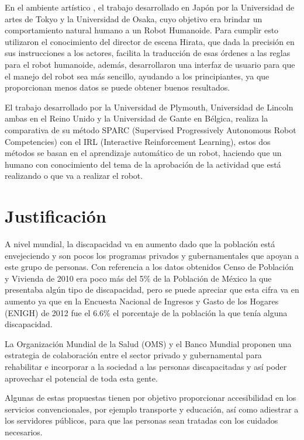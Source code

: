 En el ambiente artístico \cite{Nishiguchi2017}, el trabajo desarrollado en
 Japón por la Universidad de artes de Tokyo y la Universidad de Osaka, cuyo
 objetivo era brindar un comportamiento natural humano a un Robot Humanoide.
 Para cumplir esto utilizaron el conocimiento del director de escena Hirata,
 que dada la precisión en sus instrucciones a los actores, facilita la
 traducción de esas órdenes a las reglas para el robot humanoide, además,
 desarrollaron una interfaz de usuario para que el manejo del robot sea más
 sencillo, ayudando a los principiantes, ya que proporcionan menos datos se
 puede obtener buenos resultados.

El trabajo desarrollado por la Universidad de Plymouth, Universidad de Lincoln
 ambas en el Reino Unido y la Universidad de Gante en Bélgica\cite{Senft2016},
 realiza la comparativa de su método SPARC (Supervised Progressively Autonomous
 Robot Competencies) con el IRL (Interactive Reinforcement Learning), estos dos
 métodos se basan en el aprendizaje automático de un robot, haciendo que un
 humano con conocimiento del tema de la aprobación de la actividad que está
 realizando o que va a realizar el robot.



\section{Justificación}
A nivel mundial, la discapacidad va en aumento dado que la población está
 envejeciendo y son pocos los programas privados y gubernamentales que apoyan a
 este grupo de personas. Con referencia a los datos obtenidos Censo de Población
 y Vivienda de 2010 era poco más del 5\% de la Población de México la que
 presentaba algún tipo de discapacidad, pero se puede apreciar que esta cifra va
 en aumento ya que en la Encuesta Nacional de Ingresos y Gasto de los Hogares
 (ENIGH) de 2012 fue el 6.6\% el porcentaje de la población la que tenía alguna
 discapacidad.
 
 
La Organización Mundial de la Salud (OMS) y el Banco Mundial proponen una
 estrategia de colaboración entre el sector privado y gubernamental para
 rehabilitar e incorporar a la sociedad a las personas discapacitadas y así
 poder aprovechar el potencial de toda esta gente.
 
 
Algunas de estas propuestas tienen por objetivo proporcionar accesibilidad en
 los servicios convencionales, por ejemplo transporte y educación, así como
 adiestrar a los servidores públicos, para que las personas sean tratadas con
 los cuidados necesarios.
 
